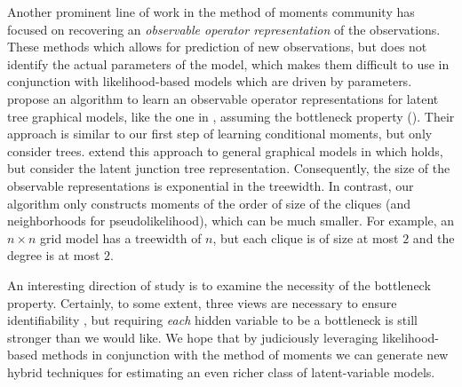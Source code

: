 Another prominent line of work in the method of moments community has
  focused on recovering an {\em observable operator
  representation} of the observations.
  These methods which allows for prediction of new observations, but does not
  identify the actual parameters of the model, which makes them difficult to use
  in conjunction with likelihood-based models which are driven by parameters.
\citet{song2011spectral} propose an algorithm to learn an observable
  operator representations for latent tree graphical models, like the
  one in , assuming the bottleneck property (). 
Their approach is similar to our first step of learning conditional moments,
  but only consider trees.
\citet{parikh12spectral} extend this approach to general graphical
  models in which  holds, but consider the latent
  junction tree representation. 
  Consequently, the size of the observable representations is exponential in
  the treewidth.
  In contrast, our algorithm only constructs moments of the order of size of the cliques
  (and neighborhoods for pseudolikelihood), which can be much smaller.
For example, an $n\times n$ grid model has a treewidth of $n$, but each
  clique is of size at most $2$ and the degree is at most $2$.

An interesting direction of study is to examine the necessity of the bottleneck
property.  Certainly, to some extent, three views are necessary to ensure
identifiability \cite{kruskal77three}, but requiring \emph{each} hidden variable to be
a bottleneck is still stronger than we would like.  We hope that by judiciously
leveraging likelihood-based methods in conjunction with the method of moments
we can generate new hybrid techniques for estimating
an even richer class of latent-variable models.
